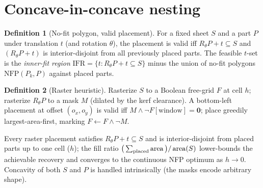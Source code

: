 \documentclass[11pt]{article}
\theoremstyle{definition}\newtheorem{definition}{Definition}[section]
\theoremstyle{plain}\newtheorem{theorem}{Theorem}[section]
\begin{document}
\section{Concave-in-concave nesting}
\begin{definition}[No-fit polygon, valid placement]
For a fixed sheet $S$ and a part $P$ under translation $t$ (and rotation $\theta$), the placement is valid iff
$R_\theta P + t \subseteq S$ and $(R_\theta P+t)$ is interior-disjoint from all previously placed parts. The
feasible $t$-set is the \emph{inner-fit region} $\mathrm{IFR}=\{t: R_\theta P+t\subseteq S\}$ minus the union
of no-fit polygons $\mathrm{NFP}(P_k,P)$ against placed parts.
\end{definition}
\begin{definition}[Raster heuristic]
Rasterize $S$ to a Boolean free-grid $F$ at cell $h$; rasterize $R_\theta P$ to a mask $M$ (dilated by the
kerf clearance). A bottom-left placement at offset $(o_x,o_y)$ is valid iff $M\wedge\lnot F[\text{window}]=\mathbf 0$;
place greedily largest-area-first, marking $F\leftarrow F\wedge\lnot M$.
\end{definition}
\begin{proposition}
Every raster placement satisfies $R_\theta P+t\subseteq S$ and is interior-disjoint from placed parts up to
one cell ($h$); the fill ratio $\big(\sum_{\text{placed}}\operatorname{area}\big)/\operatorname{area}(S)$ lower-bounds the achievable
recovery and converges to the continuous NFP optimum as $h\to0$. Concavity of both $S$ and $P$ is handled
intrinsically (the masks encode arbitrary shape).
\end{proposition}
\end{document}
